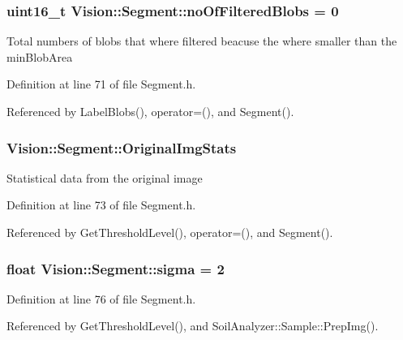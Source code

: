 \subsubsection[{no\+Of\+Filtered\+Blobs}]{\setlength{\rightskip}{0pt plus 5cm}uint16\+\_\+t Vision\+::\+Segment\+::no\+Of\+Filtered\+Blobs = 0}\label{class_vision_1_1_segment_a97077da3a144e800073bc06f5d4722d4}
Total numbers of blobs that where filtered beacuse the where smaller than the min\+Blob\+Area 

Definition at line 71 of file Segment.\+h.



Referenced by Label\+Blobs(), operator=(), and Segment().

\hypertarget{class_vision_1_1_segment_ab35cfe5504de7e5ea327991468e6cf3b}{}
\subsubsection[{Original\+Img\+Stats}]{ Vision\+::\+Segment\+::\+Original\+Img\+Stats}\label{class_vision_1_1_segment_ab35cfe5504de7e5ea327991468e6cf3b}
Statistical data from the original image 

Definition at line 73 of file Segment.\+h.



Referenced by Get\+Threshold\+Level(), operator=(), and Segment().

\hypertarget{class_vision_1_1_segment_a0d2c607a6064d8d8fea925fc7bfbbc53}{}
\subsubsection[{sigma}]{\setlength{\rightskip}{0pt plus 5cm}float Vision\+::\+Segment\+::sigma = 2}\label{class_vision_1_1_segment_a0d2c607a6064d8d8fea925fc7bfbbc53}


Definition at line 76 of file Segment.\+h.



Referenced by Get\+Threshold\+Level(), and Soil\+Analyzer\+::\+Sample\+::\+Prep\+Img().

\hypertarget{class_vision_1_1_segment_a44f45a7d08ba6fed38e5c31bc9108291}{}
